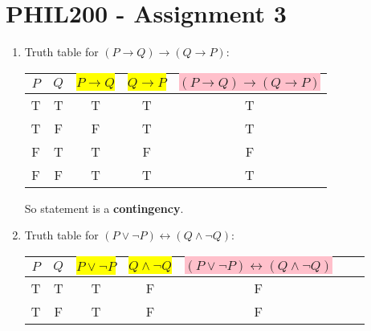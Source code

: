 \documentclass{article}
\begin{document}
\section*{PHIL200 - Assignment 3}

\begin{enumerate}
      \item Truth table for $( P\to Q)\to( Q\to P)$:
            \begin{center}
                  \begin{tabular}{c|c|c|c|c}
                        $ P$ & $ Q$ & \colorbox{yellow}{$ P\to Q$} & \colorbox{yellow}{$ Q\to P$} & \colorbox{pink}{$( P\to Q)\to( Q\to P)$} \\
                        \hline
                        T    & T    & T                            & T                            & T                                        \\
                        T    & F    & F                            & T                            & T                                        \\
                        F    & T    & T                            & F                            & F                                        \\
                        F    & F    & T                            & T                            & T                                        \\
                  \end{tabular}
            \end{center}
            So statement is a \textbf{contingency}.
      \item Truth table for $( P\lor\neg P)\leftrightarrow( Q\land\neg Q)$:
            \begin{center}
                  \begin{tabular}{c|c|c|c|c|c|c}
                        $P$ & $Q$ & \colorbox{yellow}{$P \lor \neg P$} & \colorbox{yellow}{$Q \land \neg Q$} & \colorbox{pink}{$(P \lor \neg P) \leftrightarrow (Q \land \neg Q)$} \\
                        \hline
                        T   & T   & T                                  & F                                   & F                                                                   \\
                        T   & F   & T                                  & F                                   & F                                                                   \\

\end{tabular}
\end{center}
\end{enumerate}
\end{document}
